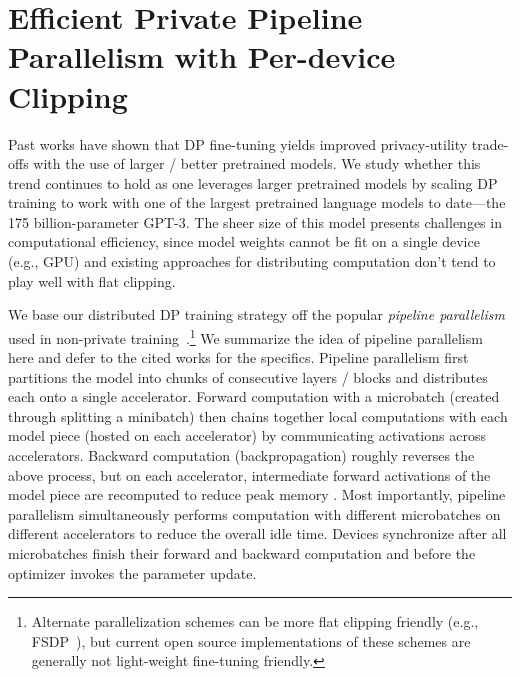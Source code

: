 \section{Efficient Private Pipeline Parallelism with Per-device Clipping}
\label{sec:per_device_clipping}
Past works have shown that DP fine-tuning yields improved privacy-utility trade-offs with the use of larger / better pretrained models. 
We study whether this trend continues to hold as one leverages larger pretrained models by scaling DP training to work with one of the largest pretrained language models to date---the 175 billion-parameter GPT-3. 
The sheer size of this model presents challenges in computational efficiency, since model weights cannot be fit on a single device (e.g., GPU) and existing approaches for distributing computation don't tend to play well with flat clipping. 

We base our distributed DP training strategy off the popular \emph{pipeline parallelism} used in non-private training~\citep{huang2019gpipe,rasley2020deepspeed}.\footnote{Alternate parallelization schemes can be more flat clipping friendly (e.g., FSDP~\citep{fsdp}), but current open source implementations of these schemes are generally not light-weight fine-tuning friendly.}
We summarize the idea of pipeline parallelism here and defer to the cited works for the specifics. 
Pipeline parallelism first partitions the model into chunks of consecutive layers / blocks and distributes each onto a single accelerator. 
Forward computation with a microbatch (created through splitting a minibatch) then chains together local computations with each model piece (hosted on each accelerator) by communicating activations across accelerators. 
Backward computation (backpropagation) roughly reverses the above process, but on each accelerator, intermediate forward activations of the model piece are recomputed to reduce peak memory \cite[Section 2.3]{huang2019gpipe}.
Most importantly, pipeline parallelism simultaneously performs computation with different microbatches on different accelerators to reduce the overall idle time.
Devices synchronize after all microbatches finish their forward and backward computation and before the optimizer invokes the parameter update. 


